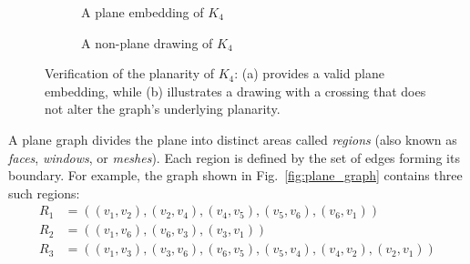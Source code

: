 \documentclass[conference]{IEEEtran}
\begin{document}
\begin{figure}[h]
\centering
\begin{subfigure}[t]{0.45\linewidth}
\centering
{}
\caption{A plane embedding of $K_4$}
\label{fig:k4_planar}
\end{subfigure}
\hfill
\begin{subfigure}[t]{0.45\linewidth}
\centering
{}
\caption{A non-plane drawing of $K_4$}
\label{fig:k4_nonplanar}
\end{subfigure}
\caption{Verification of the planarity of $K_4$: (a) provides a valid plane embedding, while (b) illustrates a drawing with a crossing that does not alter the graph's underlying planarity.}
\label{fig:k4_example}
\end{figure}


A plane graph divides the plane into distinct areas called \emph{regions} (also known as \emph{faces}, \emph{windows}, or \emph{meshes}). Each region is defined by the set of edges forming its boundary. For example, the graph shown in Fig.~\ref{fig:plane_graph} contains three such regions:
\begin{align*}
R_1 &= ((v_1, v_2), (v_2, v_4), (v_4, v_5), (v_5, v_6), (v_6, v_1)) \\
R_2 &= ((v_1, v_6), (v_6, v_3), (v_3, v_1)) \\
R_3 &= ((v_1, v_3), (v_3, v_6), (v_6, v_5), (v_5, v_4), (v_4, v_2), (v_2, v_1))
\end{align*}
\end{document}
